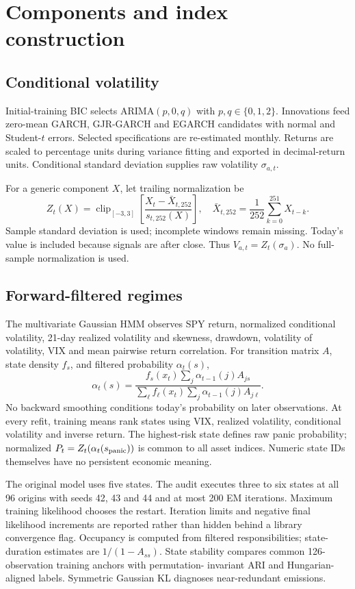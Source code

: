 \documentclass[11pt]{article}
\begin{document}
\section{Components and index construction}
\subsection{Conditional volatility}
Initial-training BIC selects ARIMA$(p,0,q)$ with $p,q\in\{0,1,2\}$. Innovations feed zero-mean
GARCH, GJR-GARCH and EGARCH candidates with normal and Student-$t$ errors. Selected specifications
are re-estimated monthly. Returns are scaled to percentage units during variance fitting and exported
in decimal-return units. Conditional standard deviation supplies raw volatility $\sigma_{a,t}$.

For a generic component $X$, let trailing normalization be
\begin{equation}
Z_t(X)=\operatorname{clip}_{[-3,3]}
\left[\frac{X_t-\bar X_{t,252}}{s_{t,252}(X)}\right],
\quad \bar X_{t,252}=\frac1{252}\sum_{k=0}^{251}X_{t-k}.
\end{equation}
Sample standard deviation is used; incomplete windows remain missing. Today's value is included
because signals are after close. Thus $V_{a,t}=Z_t(\sigma_a)$. No full-sample normalization is used.

\subsection{Forward-filtered regimes}
The multivariate Gaussian HMM observes SPY return, normalized conditional volatility, 21-day realized
volatility and skewness, drawdown, volatility of volatility, VIX and mean pairwise return correlation.
For transition matrix $A$, state density $f_s$, and filtered probability $\alpha_t(s)$,
\begin{equation}
\alpha_t(s)=\frac{f_s(x_t)\sum_j\alpha_{t-1}(j)A_{js}}
{\sum_\ell f_\ell(x_t)\sum_j\alpha_{t-1}(j)A_{j\ell}}.
\end{equation}
No backward smoothing conditions today's probability on later observations. At every refit, training
means rank states using VIX, realized volatility, conditional volatility and inverse return. The
highest-risk state defines raw panic probability; normalized $P_t=Z_t(\alpha_t(s_{\rm panic}))$
is common to all asset indices. Numeric state IDs themselves have no persistent economic meaning.

The original model uses five states. The audit executes three to six states at all 96 origins with
seeds 42, 43 and 44 and at most 200 EM iterations. Maximum training likelihood chooses the restart.
Iteration limits and negative final likelihood increments are reported rather than hidden behind a
library convergence flag. Occupancy is computed from filtered responsibilities; state-duration estimates
are $1/(1-A_{ss})$. State stability compares common 126-observation training anchors with permutation-
invariant ARI and Hungarian-aligned labels. Symmetric Gaussian KL diagnoses near-redundant emissions.
\end{document}
